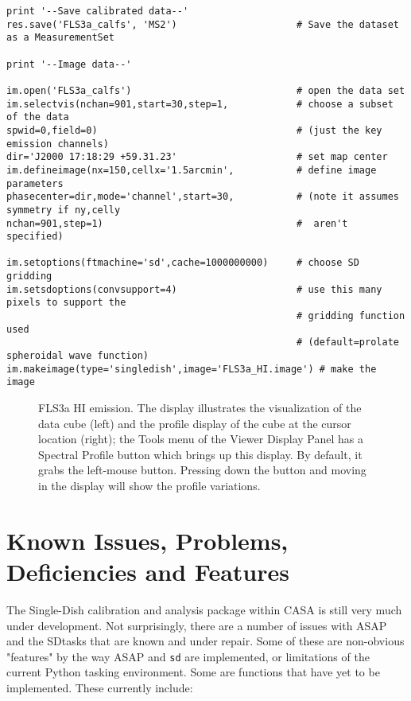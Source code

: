 \begin{verbatim}
print '--Save calibrated data--'
res.save('FLS3a_calfs', 'MS2')                     # Save the dataset as a MeasurementSet

print '--Image data--'
                                                                
im.open('FLS3a_calfs')                             # open the data set
im.selectvis(nchan=901,start=30,step=1,            # choose a subset of the data   
spwid=0,field=0)                                   # (just the key emission channels)                 
dir='J2000 17:18:29 +59.31.23'                     # set map center                
im.defineimage(nx=150,cellx='1.5arcmin',           # define image parameters
phasecenter=dir,mode='channel',start=30,           # (note it assumes symmetry if ny,celly 
nchan=901,step=1)                                  #  aren't specified)
                                                                       
im.setoptions(ftmachine='sd',cache=1000000000)     # choose SD gridding                
im.setsdoptions(convsupport=4)                     # use this many pixels to support the 
                                                   # gridding function used       
                                                   # (default=prolate spheroidal wave function)  
im.makeimage(type='singledish',image='FLS3a_HI.image') # make the image
\end{verbatim}
\normalsize

\begin{figure}[h!]
\caption{\label{fig:HI_cube} FLS3a HI emission. The display
  illustrates the visualization of the data cube (left) and the
  profile display of the cube at the cursor location (right); the
  Tools menu of the Viewer Display Panel has a Spectral Profile button
  which brings up this display. By default, it grabs the left-mouse
  button. Pressing down the button and moving in the display will show
  the profile variations. }
\hrulefill
\end{figure}

\pagebreak


\section{Known Issues, Problems, Deficiencies and Features}
\label{section:sd.issues}


The Single-Dish calibration and analysis package within CASA is still
very much under development.  Not surprisingly,
there are a number of issues with ASAP and the SDtasks that are known and
under repair.  Some of these are non-obvious "features" by the way
ASAP and {\tt sd} are implemented, or limitations of the current Python
tasking environment.  Some are functions that have yet to be
implemented.  These currently include: 

